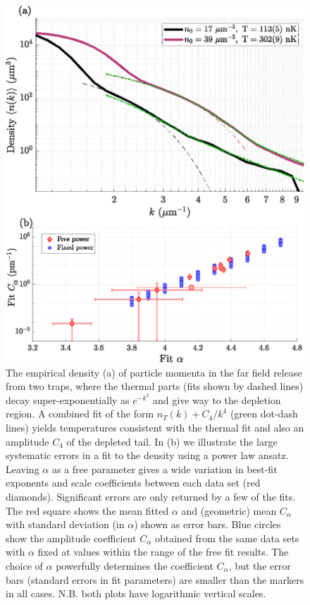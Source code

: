 	\begin{figure}
	        \includegraphics[width=\textwidth]{fig/QD/fit_issues_a}
	        \caption{The empirical density (a) of particle momenta in the far field release from two traps, where the thermal parts (fits shown by dashed lines) decay super-exponentially as $e^{-k^2}$ and give way to the depletion region. A combined fit of the form $n_T(k) + C_4/k^4$ (green dot-dash lines) yields temperatures consistent with the thermal fit and also an amplitude $C_4$ of the depleted tail.
	        In (b) we illustrate the large systematic errors in a fit to the density using a power law ansatz. Leaving $\alpha$ as a free parameter gives a wide variation in best-fit exponents and scale coefficients between each data set (red diamonds). Significant errors are only returned by a few of the fits. The red square shows the mean fitted $\alpha$ and (geometric) mean $C_\alpha$ with standard deviation (in $\alpha$) shown as error bars. Blue circles show the amplitude coefficient $C_\alpha$ obtained from the same data sets with $\alpha$ fixed at values within the range of the free fit results. The choice of $\alpha$ powerfully determines the coefficient $C_\alpha$, but the error bars (standard errors in fit parameters) are smaller than the markers in all cases. N.B. both plots have logarithmic vertical scales.}
	        \label{fig:contact_determination_issues}
	\end{figure}


